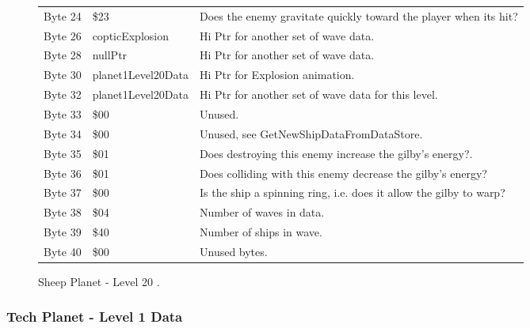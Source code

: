 \begin{figure}[H]
{\begin{adjustbox}{width=12cm}
\begin{tabular}{lll}
 Byte 24 & \$23                & Does the enemy gravitate quickly toward the player when its hit?   \\
 Byte 26 & copticExplosion    & Hi Ptr for another set of wave data.                               \\
 Byte 28 & nullPtr            & Hi Ptr for another set of wave data.                               \\
 Byte 30 & planet1Level20Data & Hi Ptr for Explosion animation.                                    \\
 Byte 32 & planet1Level20Data & Hi Ptr for another set of wave data for this level.                \\
 Byte 33 & \$00                & Unused.                                                            \\
 Byte 34 & \$00                & Unused, see GetNewShipDataFromDataStore.                           \\
 Byte 35 & \$01                & Does destroying this enemy increase the gilby's energy?.           \\
 Byte 36 & \$01                & Does colliding with this enemy decrease the gilby's energy?        \\
 Byte 37 & \$00                & Is the ship a spinning ring, i.e. does it allow the gilby to warp? \\
 Byte 38 & \$04                & Number of waves in data.                                           \\
 Byte 39 & \$40                & Number of ships in wave.                                           \\
 Byte 40 & \$00                & Unused bytes.                                                      \\
\bottomrule
\end{tabular}

  \end{adjustbox}

  }\caption*{Sheep Planet - Level 20
.}
\end{figure}

\clearpage
\subsubsection{Tech Planet - Level 1 Data}

